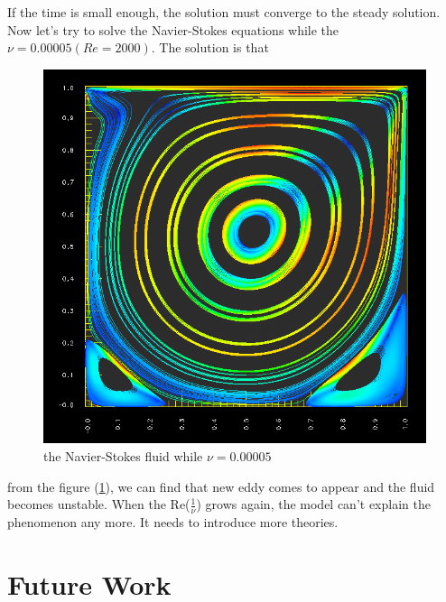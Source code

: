 \documentclass[a4paper]{article}
\begin{document}
If the time is small enough, the solution must converge to the steady solution. Now let's try to solve the Navier-Stokes equations while the $\nu=0.00005(Re=2000)$. The solution is that
\begin{figure}[h]
\centering
\includegraphics[scale = 0.5]{e.png}
\caption{the Navier-Stokes fluid while $\nu=0.00005$}
\label{im::d}
\end{figure}
from the figure (\ref{im::d}), we can find that new eddy comes to appear and the fluid becomes unstable. When the Re($\frac{1}{\nu}$) grows again, the model can't explain the phenomenon any more. It needs to introduce more theories.
\section{Future Work}
\end{document}
